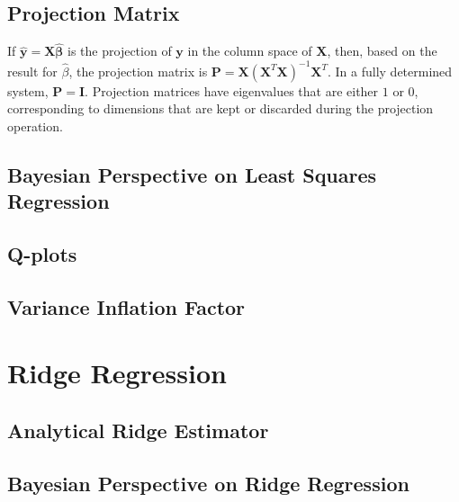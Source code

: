 \subsection{Projection Matrix}

If $\mathbf{\hat{y}}=\mathbf{X}\mathbf{\hat{\beta}}$ is the projection of $\mathbf{y}$ in the column space of $\mathbf{X}$, then, based on the result for $\hat{\beta}$, the projection matrix is $\mathbf{P} = \mathbf{X}\left(\mathbf{X}^T\mathbf{X}\right)^{-1}\mathbf{X}^T$. In a fully determined system, $\mathbf{P}=\mathbf{I}$. Projection matrices have eigenvalues that are either $1$ or $0$, corresponding to dimensions that are kept or discarded during the projection operation.


\subsection{Bayesian Perspective on Least Squares Regression}




\subsection{Q-plots}
\subsection{Variance Inflation Factor}



\section{Ridge Regression}
\subsection{Analytical Ridge Estimator}
\subsection{Bayesian Perspective on Ridge Regression}


\chapauthor{}

